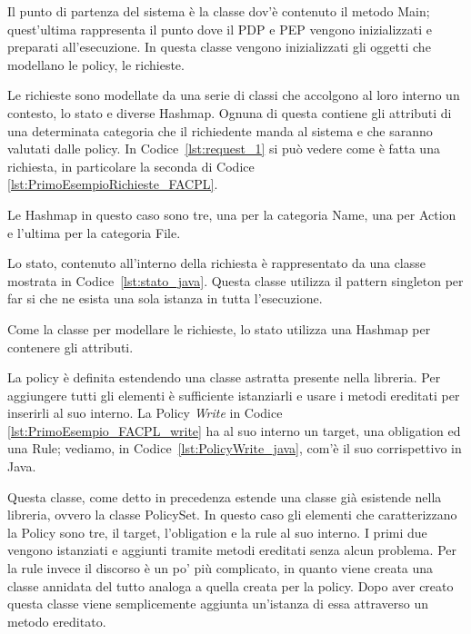 Il punto di partenza del sistema è la classe dov'è contenuto il metodo Main; quest'ultima rappresenta il punto dove il \ac{PDP} e \ac{PEP} vengono inizializzati e preparati all'esecuzione. In questa classe vengono inizializzati gli oggetti che modellano le policy, le richieste. \par
Le richieste sono modellate da una serie di classi che accolgono al loro interno un contesto, lo stato e diverse Hashmap. Ognuna di questa contiene gli attributi di una determinata categoria che il richiedente manda al sistema e che saranno valutati dalle policy. In Codice~\ref{lst:request_1} si può vedere come è fatta una richiesta, in particolare la seconda di Codice \ref{lst:PrimoEsempioRichieste_FACPL}.

Le Hashmap in questo caso sono tre, una per la categoria Name, una per Action e l'ultima per la categoria File. \par
Lo stato, contenuto all'interno della richiesta è rappresentato da una classe mostrata in Codice~\ref{lst:stato_java}. Questa classe utilizza il pattern singleton per far si che ne esista una sola istanza in tutta l'esecuzione. 

Come la classe per modellare le richieste, lo stato utilizza una Hashmap per contenere gli attributi.\par
La policy è definita estendendo una classe astratta presente nella libreria. Per aggiungere tutti gli elementi è sufficiente istanziarli e usare i metodi ereditati per inserirli al suo interno.
La Policy \textit{Write} in Codice \ref{lst:PrimoEsempio_FACPL_write} ha al suo interno un target, una obligation ed una Rule; vediamo, in Codice~\ref{lst:PolicyWrite_java}, com'è il suo corrispettivo in Java.

Questa classe, come detto in precedenza estende una classe già esistende nella libreria, ovvero la classe PolicySet. In questo caso gli elementi che caratterizzano la Policy sono tre, il target, l'obligation e la rule al suo interno. I primi due vengono istanziati e aggiunti tramite metodi ereditati senza alcun problema. Per la rule invece il discorso è un po' più complicato, in quanto viene creata una classe annidata del tutto analoga a quella creata per la policy. Dopo aver creato questa classe viene semplicemente aggiunta un'istanza di essa attraverso un metodo ereditato.
